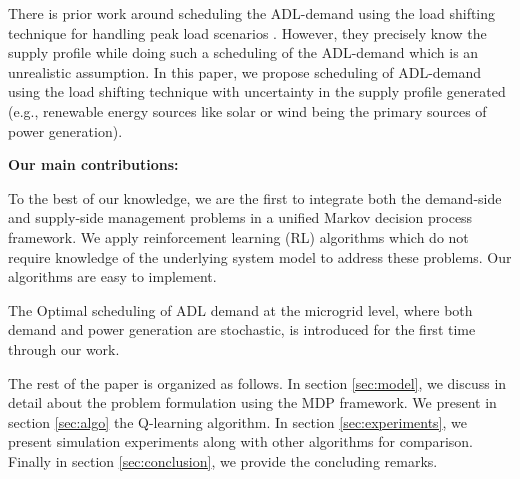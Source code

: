There is prior work around scheduling the ADL-demand using the load shifting technique for handling  peak load scenarios \cite{CL2014}. However, they precisely know the supply profile while doing such a scheduling of the ADL-demand which is an unrealistic assumption. In this paper, we propose scheduling of ADL-demand using the load shifting technique with uncertainty in the supply profile generated (e.g., renewable energy sources like solar or wind being the primary sources of power generation).


\textbf{Our main contributions:}\\
\begin{inparaenum}[\bfseries (i)]
\item To the best of our knowledge, we are the first  to integrate both the demand-side and supply-side management problems  in a unified Markov decision process framework. We apply reinforcement learning (RL) algorithms which do not require knowledge of the underlying system model to address these problems. Our algorithms are easy to implement.\\
\item The Optimal scheduling of ADL demand at the microgrid level, where both  demand and power generation are stochastic, is  introduced for the first time through our work. \\    
\end{inparaenum}
The rest of the paper is organized as follows. In section \ref{sec:model}, we discuss in detail about the problem formulation using the MDP framework. We present  in section \ref{sec:algo} the Q-learning algorithm. In section \ref{sec:experiments}, we present simulation experiments along with other algorithms for comparison. Finally in section \ref{sec:conclusion}, we provide the concluding remarks.